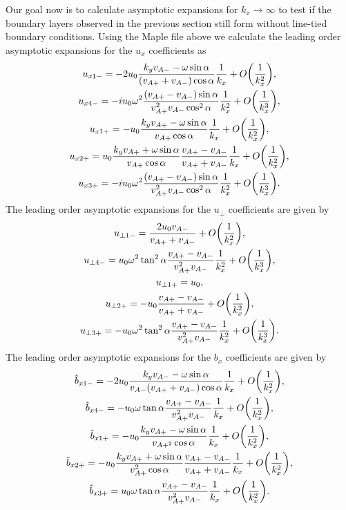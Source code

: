 Our goal now is to calculate asymptotic expansions for $k_x\rightarrow\infty$ to test if the boundary layers observed in the previous section still form without line-tied boundary conditions. Using the Maple file above we calculate the leading order asymptotic expansions for the $u_x$ coefficients as
\begin{gather}
    \label{eq:oblique_field_uniform_in_x_ux10-}
    u_{x 1-} = -2u_0\frac{k_yv_{A-}-\omega\sin\alpha}{(v_{A+}+v_{A-})\cos\alpha}\frac{1}{k_x} + O\qty(\frac{1}{k_x^2}), \\
    u_{x 4-} = -iu_0\omega^2\frac{(v_{A+}-v_{A-})\sin\alpha}{v_{A+}^2v_{A-}\cos^2\alpha}\frac{1}{k_x^2} + O\qty(\frac{1}{k_x^3}), \\
    u_{x 1+} = -u_0\frac{k_yv_{A+}-\omega\sin\alpha}{v_{A+}\cos\alpha}\frac{1}{k_x} + O\qty(\frac{1}{k_x^2}), \\
    u_{x 2+} = u_0\frac{k_yv_{A+}+\omega\sin\alpha}{v_{A+}\cos\alpha}\frac{v_{A+}-v_{A-}}{v_{A+}+v_{A-}}\frac{1}{k_x} + O\qty(\frac{1}{k_x^2}), \\
    u_{x 3+} = -iu_0\omega^2\frac{(v_{A+}-v_{A-})\sin\alpha}{v_{A+}^2v_{A-}\cos^2\alpha}\frac{1}{k_x^2} + O\qty(\frac{1}{k_x^3}).
\end{gather}
The leading order asymptotic expansions for the $u_\perp$ coefficients are given by
\begin{gather}
    u_{\perp 1-} = \frac{2u_0v_{A-}}{v_{A+}+v_{A-}} + O\qty(\frac{1}{k_x^2}), \\
    u_{\perp 4-} = u_0\omega^2\tan^2\alpha\frac{v_{A+}-v_{A-}}{v_{A+}^2v_{A-}}\frac{1}{k_x^2} + O\qty(\frac{1}{k_x^3}), \\
    u_{\perp 1+} = u_0, \\
    u_{\perp 2+} = -u_0\frac{v_{A+}-v_{A-}}{v_{A+}+v_{A-}} + O\qty(\frac{1}{k_x^2}), \\
    \label{eq:oblique_field_uniform_in_x_u_perp30+}
    u_{\perp 3+} = -u_0\omega^2\tan^2\alpha\frac{v_{A+}-v_{A-}}{v_{A+}^2v_{A-}}\frac{1}{k_x^2} + O\qty(\frac{1}{k_x^3}).
\end{gather}
The leading order asymptotic expansions for the $b_x$ coefficients are given by
\begin{gather}
    \hat{b}_{x 1-} = -2u_0\frac{k_yv_{A-}-\omega\sin\alpha}{v_{A-}(v_{A+}+v_{A-})\cos\alpha}\frac{1}{k_x} + O\qty(\frac{1}{k_x^2}), \\
    \hat{b}_{x 4-} = -u_0\omega\tan\alpha\frac{v_{A+}-v_{A-}}{v_{A+}^2v_{A-}}\frac{1}{k_x} + O\qty(\frac{1}{k_x^2}), \\
    \hat{b}_{x 1+} = -u_0\frac{k_yv_{A+}-\omega\sin\alpha}{v_{A+^2}\cos\alpha}\frac{1}{k_x} + O\qty(\frac{1}{k_x^2}), \\
    \hat{b}_{x 2+} = -u_0\frac{k_y v_{A+} + \omega \sin\alpha}{v_{A+}^2 \cos\alpha}\frac{v_{A+} - v_{A-}}{v_{A+} + v_{A-}}\frac{1}{k_x} + O\qty(\frac{1}{k_x^2}), \\
    \hat{b}_{x 3+} = u_0\omega\tan\alpha\frac{v_{A+}-v_{A-}}{v_{A+}^2v_{A-}}\frac{1}{k_x} + O\qty(\frac{1}{k_x^2}).
\end{gather}
